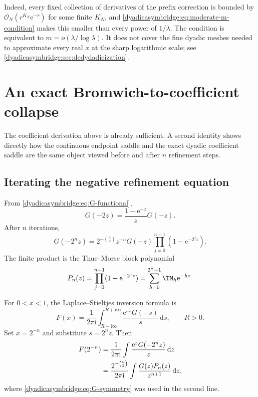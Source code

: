 \documentclass[11pt,oneside]{article}
\theoremstyle{definition}
\theoremstyle{remark}
\newcommand{\e}{\mathrm e}
\newcommand{\ii}{\mathrm i}
\newcommand{\dd}{\,\mathrm d}
\newcommand{\bigO}{\mathcal O}
\begin{document}
Indeed, every fixed collection of derivatives of the prefix correction is bounded by
$\bigO_N(r^{K_N}\e^{-r})$ for some finite $K_N$, and \eqref{dyadicasymbridge:eq:moderate-m-condition} makes this smaller than every power of $1/\lambda$.  The condition is equivalent to
$m=o(\lambda/\log\lambda)$.  It does not cover the fine dyadic meshes needed to approximate every real $x$ at the sharp logarithmic scale; see
\cref{dyadicasymbridge:sec:dedydadicization}.

\section{An exact Bromwich-to-coefficient collapse}
\label{dyadicasymbridge:sec:bromwich-collapse}

The coefficient derivation above is already sufficient.  A second identity shows directly how the continuous endpoint saddle and the exact dyadic coefficient saddle are the same object viewed before and after $n$ refinement steps.

\subsection{Iterating the negative refinement equation}

From \eqref{dyadicasymbridge:eq:G-functional},
\begin{equation}
 G(-2z)=\frac{1-\e^{-z}}zG(-z).
\label{dyadicasymbridge:eq:negative-refinement}
\end{equation}
After $n$ iterations,
\begin{equation}
 G(-2^nz)=
 2^{-\binom n2}z^{-n}G(-z)
 \prod_{j=0}^{n-1}(1-\e^{-2^jz}).
\label{dyadicasymbridge:eq:negative-refinement-iterated}
\end{equation}
The finite product is the Thue--Morse block polynomial
\begin{equation}
 P_n(z)=\prod_{j=0}^{n-1}(1-\e^{-2^jz})
 =\sum_{h=0}^{2^n-1}\TM_h\e^{-hz}.
\label{dyadicasymbridge:eq:Pn-TM}
\end{equation}

For $0<x<1$, the Laplace--Stieltjes inversion formula is
\begin{equation}
 F(x)=\frac1{2\pi\ii}
 \int_{R-\ii\infty}^{R+\ii\infty}
 \frac{\e^{sx}G(-s)}s\dd s,
 \qquad R>0.
\label{dyadicasymbridge:eq:Bromwich-F}
\end{equation}
Set $x=2^{-n}$ and substitute $s=2^nz$.  Then
\begin{align}
 F(2^{-n})
 &=\frac1{2\pi\ii}\int
 \frac{\e^zG(-2^nz)}z\dd z                              \notag\\
 &=\frac{2^{-\binom n2}}{2\pi\ii}
 \int
 \frac{G(z)P_n(z)}{z^{n+1}}\dd z,
\label{dyadicasymbridge:eq:Bromwich-rescaled}
\end{align}
where \eqref{dyadicasymbridge:eq:G-symmetry} was used in the second line.
\end{document}
